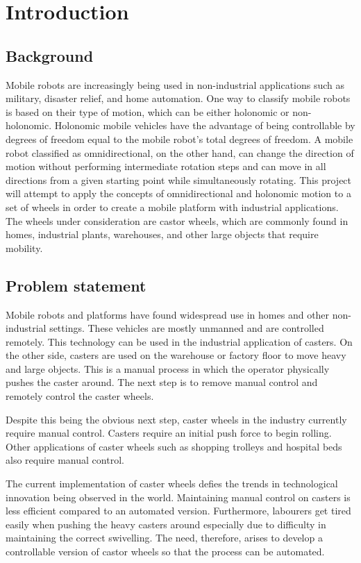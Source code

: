 \chapter{Introduction}
\newcommand{\sectionbreak}{\clearpage}

\label{sec:introduction}
\section{Background}
Mobile robots are increasingly being used in non-industrial applications such as military, disaster relief, and home automation. One way to classify mobile robots is based on their type of motion, which can be either holonomic or non-holonomic. Holonomic mobile vehicles have the advantage of being controllable by degrees of freedom equal to the mobile robot's total degrees of freedom. A mobile robot classified as omnidirectional, on the other hand, can change the direction of motion without performing intermediate rotation steps and can move in all directions from a given starting point while simultaneously rotating. This project will attempt to apply the concepts of omnidirectional and holonomic motion to a set of wheels in order to create a mobile platform with industrial applications. The wheels under consideration are castor wheels, which are commonly found in homes, industrial plants, warehouses, and other large objects that require mobility.

\section{Problem statement}

Mobile robots and platforms have found widespread use in homes and other non-industrial settings. These vehicles are mostly unmanned and are controlled remotely. This technology can be used in the industrial application of casters. On the other side, casters are used on the warehouse or factory floor to move heavy and large objects. This is a manual process in which the operator physically pushes the caster around. The next step is to remove manual control and remotely control the caster wheels.
\par
Despite this being the obvious next step, caster wheels in the industry currently require manual control. Casters require an initial push force to begin rolling. Other applications of caster wheels such as shopping trolleys and hospital beds also require manual control. 
\par
The current implementation of caster wheels defies the trends in technological innovation being observed in the world. Maintaining manual control on casters is less efficient compared to an automated version. Furthermore, labourers get tired easily when pushing the heavy casters around especially due to difficulty in maintaining the correct swivelling. The need, therefore, arises to develop a controllable version of castor wheels so that the process can be automated.

